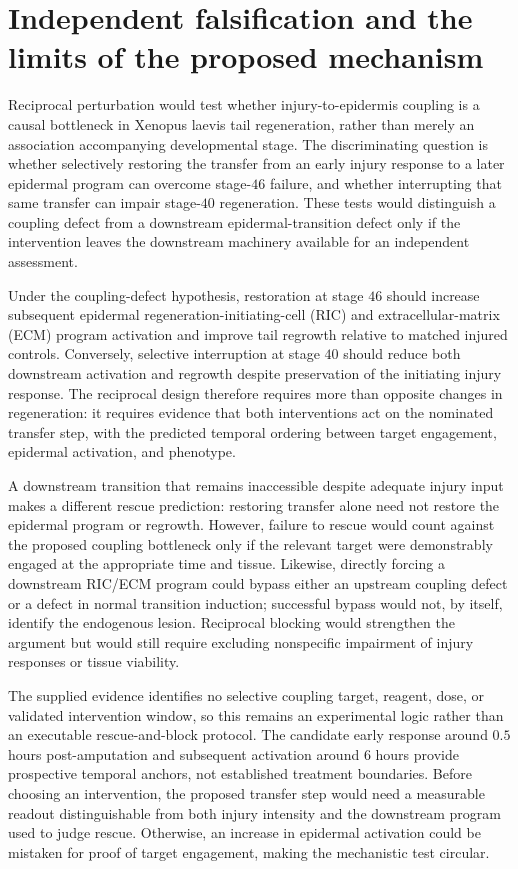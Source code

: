 \documentclass[11pt]{article}
\begin{document}
\section{Independent falsification and the limits of the proposed mechanism}
Reciprocal perturbation would test whether injury-to-epidermis coupling is a causal bottleneck in Xenopus laevis tail regeneration, rather than merely an association accompanying developmental stage. The discriminating question is whether selectively restoring the transfer from an early injury response to a later epidermal program can overcome stage-$46$ failure, and whether interrupting that same transfer can impair stage-$40$ regeneration. These tests would distinguish a coupling defect from a downstream epidermal-transition defect only if the intervention leaves the downstream machinery available for an independent assessment.

Under the coupling-defect hypothesis, restoration at stage $46$ should increase subsequent epidermal regeneration-initiating-cell (RIC) and extracellular-matrix (ECM) program activation and improve tail regrowth relative to matched injured controls. Conversely, selective interruption at stage $40$ should reduce both downstream activation and regrowth despite preservation of the initiating injury response. The reciprocal design therefore requires more than opposite changes in regeneration: it requires evidence that both interventions act on the nominated transfer step, with the predicted temporal ordering between target engagement, epidermal activation, and phenotype.

A downstream transition that remains inaccessible despite adequate injury input makes a different rescue prediction: restoring transfer alone need not restore the epidermal program or regrowth. However, failure to rescue would count against the proposed coupling bottleneck only if the relevant target were demonstrably engaged at the appropriate time and tissue. Likewise, directly forcing a downstream RIC/ECM program could bypass either an upstream coupling defect or a defect in normal transition induction; successful bypass would not, by itself, identify the endogenous lesion. Reciprocal blocking would strengthen the argument but would still require excluding nonspecific impairment of injury responses or tissue viability.

The supplied evidence identifies no selective coupling target, reagent, dose, or validated intervention window, so this remains an experimental logic rather than an executable rescue-and-block protocol. The candidate early response around $0.5$ hours post-amputation and subsequent activation around $6$ hours provide prospective temporal anchors, not established treatment boundaries. Before choosing an intervention, the proposed transfer step would need a measurable readout distinguishable from both injury intensity and the downstream program used to judge rescue. Otherwise, an increase in epidermal activation could be mistaken for proof of target engagement, making the mechanistic test circular.
\end{document}
